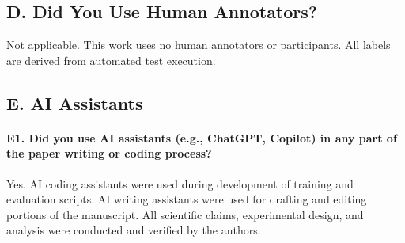 \subsection*{D. Did You Use Human Annotators?}

Not applicable. This work uses no human annotators or participants. All labels are derived from automated test execution.

\subsection*{E. AI Assistants}

\paragraph{E1. Did you use AI assistants (e.g., ChatGPT, Copilot) in any part of the paper writing or coding process?}
Yes. AI coding assistants were used during development of training and evaluation scripts. AI writing assistants were used for drafting and editing portions of the manuscript. All scientific claims, experimental design, and analysis were conducted and verified by the authors.
